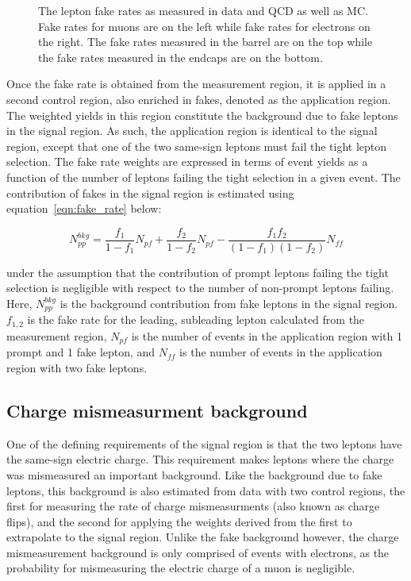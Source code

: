 \begin{figure}[htp]
\caption[Fake rate measurements in data and MC.]{The lepton fake rates as measured in data and QCD as well as \ttbar MC. Fake rates for muons are on the left while fake rates for electrons on the right. The fake rates
measured in the barrel are on the top while the fake rates measured in the endcaps are on the bottom.}
\label{fig:fakerate}
\end{figure}

Once the fake rate is obtained from the measurement region, it is applied in a second control region, also enriched in fakes, denoted as the application region. The weighted yields in this region constitute the background due to
fake leptons in the signal region. As such, the application region is identical to the signal region, except that one of the two same-sign leptons must fail the tight lepton selection. The fake rate weights are expressed
in terms of event yields as a function of the number of leptons failing the tight selection in a given event. The contribution of fakes in the signal region is estimated using equation~\ref{eqn:fake_rate} below:

\begin{equation}
\label{eqn:fake_rate}
  N_{pp}^{bkg} = \frac{f_{1}}{1-f_{1}}N_{pf} + \frac{f_{2}}{1-f_{2}}N_{pf} - \frac{f_{1}f_{2}}{(1-f_{1})(1-f_{2})}N_{ff}
\end{equation}

\noindent under the assumption that the contribution of prompt leptons failing the tight selection is negligible with respect to the number of non-prompt leptons failing. Here, $N_{pp}^{bkg}$ is the background contribution from fake leptons
in the signal region. $f_{1,2}$ is the fake rate for the leading, subleading lepton calculated from the measurement region, $N_{pf}$ is the number of events in the application region with 1 prompt and 1 fake lepton, and $N_{ff}$ is the
number of events in the application region with two fake leptons. 

\subsection{Charge mismeasurment background}
One of the defining requirements of the signal region is that the two leptons have the same-sign electric charge. This requirement makes leptons where the charge was mismeasured an important background. Like the background due to fake leptons,
this background is also estimated from data with two control regions, the first for measuring the rate of charge mismeasurments (also known as charge flips), and the second for applying the weights derived from the first to extrapolate to
the signal region. Unlike the fake background however, the charge mismeasurement background is only comprised of events with electrons, as the probability for mismeasuring the electric charge of a muon is negligible.

